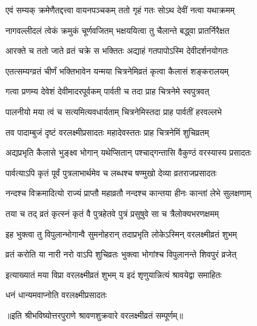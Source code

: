 \begin{center}
\twolineshloka
{एवं सम्यक् क्रमेणैतद्दत्त्वा वायनपञ्चकम्}
{ततो गृहं गतः सोऽथ देवीं नत्वा यथाक्रमम्}%


\twolineshloka
{नागवल्लीदलं त्वेकं क्रमुकं चूर्णवजितम्}
{भक्षययित्वा तु चैलान्ते बद्ध्वा प्रातर्निरैक्षत}%


\twolineshloka
{आरक्ते च ततो जाते व्रतं चक्रे स भक्तितः}
{अद्याहं गतपापोऽस्मि देवीदर्शनयोगतः}%


\twolineshloka
{एतत्सम्यग्व्रतं चीर्णं भक्तिभावेन यन्मया}
{चित्रनेमिव्रतं कृत्वा कैलासं शङ्करालयम्}%


\twolineshloka
{गत्वा प्रणम्य देवेशं देवीमादरपूर्वकम्}
{पार्वती च तदा प्राह चित्रनेमे स्वपुत्रवत्}%


\twolineshloka
{पालनीयो मया त्वं च सत्यमित्यवधार्यताम्}
{चित्रनेमिस्तदा प्राह पार्वतीं हरवल्लभे}%


\twolineshloka
{तव पादाम्बुजं दृष्टं वरलक्ष्मीप्रसादतः}
{महादेवस्ततः प्राह चित्रनेमिं शुचिव्रतम्}%


\twolineshloka
{अद्यप्रभृति कैलासे भुङ्क्ष्व भोगान् यथेप्सितान्}
{पश्चाद्गन्तासि वैकुण्ठं वरस्यास्य प्रसादतः}%


\twolineshloka
{पार्वत्याऽपि कृतं पूर्वं पुत्रलाभार्थमेव च}
{लब्धश्च षण्मुखो देव्या व्रतराजप्रसादतः}%


\twolineshloka
{नन्दश्च विक्रमादित्यो राज्यं प्राप्तौ महाव्रतौ}
{नन्दश्च कान्तया हीनः कान्तां लेभे सुलक्षणाम्}%


\twolineshloka
{तया च तद् व्रतं कृत्स्नं कृतं वै पुत्रहेतवे}
{पुत्रं प्रसुषुवे सा च त्रैलोक्यभरणक्षमम्}%


\twolineshloka
{इह भुक्त्वा तु विपुलान्भोगान्वै सुमनोहरान्}
{तदाप्रभृति लोकेऽस्मिन् वरलक्ष्मीव्रतं शुभम्}%


\twolineshloka
{व्रतं करोति या नारी नरो वाऽपि शुचिव्रतः}
{भुक्त्वा भोगांश्च विपुलानन्ते शिवपुरं व्रजेत्}%


\twolineshloka
{इत्याख्यातं मया विप्रा वरलक्ष्मीव्रतं शुभम्}
{य इदं शृणुयान्नित्यं श्रावयेद्वा समाहितः}%

\onelineshloka
{धनं धान्यमवाप्नोति वरलक्ष्मीप्रसादतः}%

॥इति श्रीभविष्योत्तरपुराणे श्रावणशुक्रवारे वरलक्ष्मीव्रतं सम्पूर्णम्॥

\end{center}